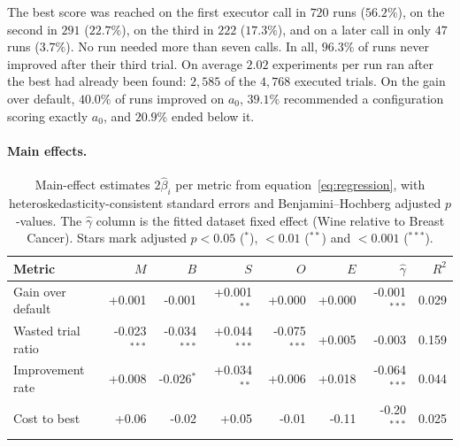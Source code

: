 \documentclass[11pt]{article}
\begin{document}
The best score was reached on the first executor call in $720$ runs ($56.2\%$), on the second in $291$ ($22.7\%$), on the third in $222$ ($17.3\%$), and on a later call in only $47$ runs ($3.7\%$). No run needed more than seven calls. In all, $96.3\%$ of runs never improved after their third trial. On average $2.02$ experiments per run ran after the best had already been found: $2{,}585$ of the $4{,}768$ executed trials. On the gain over default, $40.0\%$ of runs improved on $a_0$, $39.1\%$ recommended a configuration scoring exactly $a_0$, and $20.9\%$ ended below it.

\paragraph{Main effects.}

\begin{table}[t]
\centering
\small
\caption{Main-effect estimates $2\hat\beta_i$ per metric from equation~\eqref{eq:regression}, with heteroskedasticity-consistent standard errors and Benjamini--Hochberg adjusted $p$-values. The $\hat\gamma$ column is the fitted dataset fixed effect (Wine relative to Breast Cancer).
Stars mark adjusted $p<0.05$ ($^{*}$), $<0.01$ ($^{**}$) and $<0.001$ ($^{***}$).}
\label{tab:main}
\begin{tabular}{lrrrrrrr}
\toprule
Metric & $M$ & $B$ & $S$ & $O$ & $E$ & $\hat\gamma$ & $R^2$ \\
\midrule
Gain over default   & +0.001 & -0.001 & +0.001$^{**}$ & +0.000 & +0.000 & -0.001$^{***}$ & 0.029 \\
Wasted trial ratio  & -0.023$^{***}$ & -0.034$^{***}$ & +0.044$^{***}$ & -0.075$^{***}$ & +0.005 & -0.003 & 0.159 \\
Improvement rate    & +0.008 & -0.026$^{*}$ & +0.034$^{**}$ & +0.006 & +0.018 & -0.064$^{***}$ & 0.044 \\
Cost to best        & +0.06 & -0.02 & +0.05 & -0.01 & -0.11 & -0.20$^{***}$ & 0.025 \\
\bottomrule
\end{tabular}
\end{table}
\end{document}
